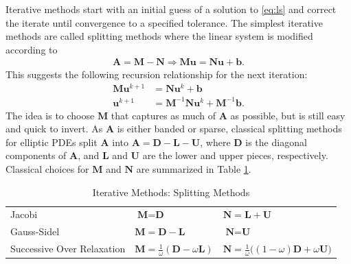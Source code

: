 Iterative methods start with an initial guess of a solution to \ref{eq:ls} and correct the iterate until convergence to a specified tolerance. The simplest iterative methods are called splitting methods where the linear system is modified according to
\begin{align}
\textbf{A} = \textbf{M} - \textbf{N} \Rightarrow \textbf{M} \textbf{u} = \textbf{N} \textbf{u} + \textbf{b}.
\end{align}
This suggests the following recursion relationship for the next iteration:
\begin{align}
\textbf{M} \textbf{u}^{k+1} &= \textbf{N} \textbf{u}^k + \textbf{b} \\
\textbf{u}^{k+1} &= \textbf{M}^{-1} \textbf{N} \textbf{u}^k + \textbf{M}^{-1} \textbf{b}.
\end{align}
The idea is to choose $\textbf{M}$ that captures as much of $\textbf{A}$ as possible, but is still easy and quick to invert. As $\textbf{A}$ is either banded or sparse, classical splitting methods for elliptic PDEs split $\textbf{A}$ into $\textbf{A} = \textbf{D} - \textbf{L} - \textbf{U}$, where $\textbf{D}$ is the diagonal components of $\textbf{A}$, and $\textbf{L}$ and $\textbf{U}$ are the lower and upper pieces, respectively. Classical choices for $\textbf{M}$ and $\textbf{N}$ are summarized in Table \ref{tab:splitting}.

\begin{table}[h!]
    \centering
    \begin{tabular}{ | l | l | l |}
        \hline
        Jacobi & $\textbf{M} = \textbf{D}$ & $\textbf{N} = \textbf{L} + \textbf{U}$ \\
        Gauss-Sidel & $\textbf{M} = \textbf{D} - \textbf{L}$ & $\textbf{N} = \textbf{U}$ \\
        Successive Over Relaxation & $\textbf{M} = \frac{1}{\omega}(\textbf{D} - \omega \textbf{L})$ & $\textbf{N} = \frac{1}{\omega} \big( (1 - \omega) \textbf{D} + \omega \textbf{U} \big)$ \\
        \hline
    \end{tabular}
    \caption{Iterative Methods: Splitting Methods}
    \label{tab:splitting}
\end{table}

